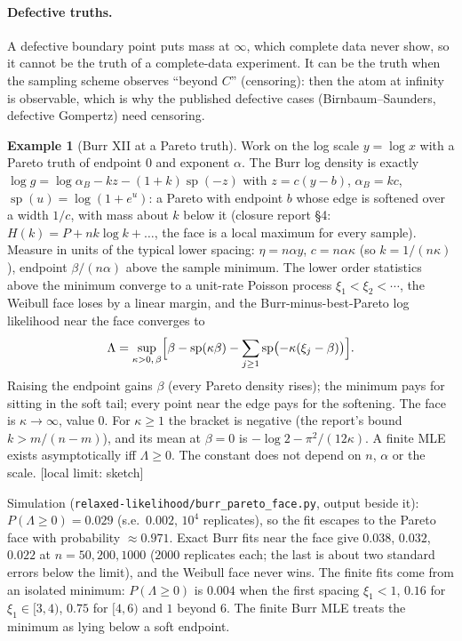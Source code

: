 \documentclass[11pt]{article}
\newcommand{\status}[1]{\textsf{[#1]}}
\theoremstyle{definition}
\newtheorem{example}[theorem]{Example}
\theoremstyle{remark}
\begin{document}
\paragraph{Defective truths.} A defective boundary point puts mass at
$\infty$, which complete data never show, so it cannot be the truth of a
complete-data experiment. It can be the truth when the sampling scheme
observes ``beyond $C$'' (censoring): then the atom at infinity is
observable, which is why the published defective cases (Birnbaum--Saunders,
defective Gompertz) need censoring.

\begin{example}[Burr XII at a Pareto truth]\label{ex:burr-pareto}
Work on the log scale $y=\log x$ with a Pareto truth of endpoint $0$ and
exponent $\alpha$. The Burr log density is exactly
$\log g=\log\alpha_B-kz-(1+k)\operatorname{sp}(-z)$ with $z=c(y-b)$,
$\alpha_B=kc$, $\operatorname{sp}(u)=\log(1+e^u)$: a Pareto with endpoint $b$
whose edge is softened over a width $1/c$, with mass about $k$ below it
(closure report \S4: $H(k)=P+nk\log k+\dots$, the face is a local maximum
for every sample). Measure in units of the typical lower spacing: $\eta=n\alpha
y$, $c=n\alpha\kappa$ (so $k=1/(n\kappa)$), endpoint $\beta/(n\alpha)$ above the
sample minimum. The lower order statistics above the minimum converge to a
unit-rate Poisson process $\xi_1<\xi_2<\cdots$, the Weibull face loses by a
linear margin, and the Burr-minus-best-Pareto log likelihood near the face
converges to
\[
 \Lambda=\sup_{\kappa>0,\,\beta}\Bigl[\beta-\operatorname{sp}(\kappa\beta)
 -\sum_{j\ge1}\operatorname{sp}\bigl(-\kappa(\xi_j-\beta)\bigr)\Bigr].
\]
Raising the endpoint gains $\beta$ (every Pareto density rises); the minimum
pays for sitting in the soft tail; every point near the edge pays for the
softening. The face is $\kappa\to\infty$, value $0$. For $\kappa\ge1$ the
bracket is negative (the report's bound $k>m/(n-m)$), and its mean at
$\beta=0$ is $-\log2-\pi^2/(12\kappa)$. A finite MLE exists asymptotically iff
$\Lambda\ge0$. The constant does not depend on $n$, $\alpha$ or the scale.
\status{local limit: sketch}

Simulation (\texttt{relaxed-likelihood/burr\_pareto\_face.py}, output beside
it): $P(\Lambda\ge0)=0.029$ (s.e.\ $0.002$, $10^4$ replicates), so the fit
escapes to the Pareto face with probability $\approx0.971$. Exact Burr fits
near the face give $0.038$, $0.032$, $0.022$ at $n=50,200,1000$ ($2000$
replicates each; the last is about two standard errors below the limit),
and the Weibull face never wins. The finite fits come from an isolated
minimum: $P(\Lambda\ge0)$ is $0.004$ when the first spacing $\xi_1<1$,
$0.16$ for $\xi_1\in[3,4)$, $0.75$ for $[4,6)$ and $1$ beyond $6$. The finite
Burr MLE treats the minimum as lying below a soft endpoint.
\end{example}
\end{document}
